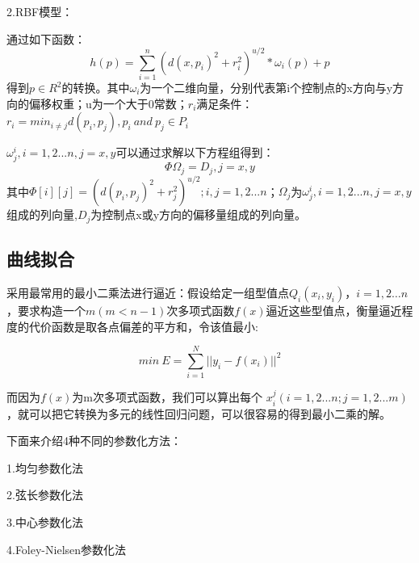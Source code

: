 \documentclass{article}
\begin{document}
    2.RBF模型：
    
    通过如下函数：
    $$h(p) = \sum_{i=1}^n (d(x,p_i)^2+r_i^2)^{u/2}*\omega_i(p)+p$$
    得到$p\in R^2$的转换。其中$\omega_i$为一个二维向量，分别代表第i个控制点的x方向与y方向的偏移权重；u为一个大于0常数；$r_i$满足条件：$r_i = min_{i\neq j}d(p_i,p_j),p_i \ and \  p_j \in P_i$
    
    $\omega^i_j,i=1,2...n,j=x,y$可以通过求解以下方程组得到：
    $$\Phi \Omega_j = D_j,j=x,y$$
    其中$\Phi[i][j] = (d(p_i,p_j)^2+r_j^2)^{u/2};i,j = 1,2...n$；$\Omega_j$为$\omega^i_j,i=1,2...n,j=x,y$组成的列向量,$D_j$为控制点x或y方向的偏移量组成的列向量。
    
    
    
    
    \subsection{曲线拟合}
    
	采用最常用的最小二乘法进行逼近：假设给定一组型值点$Q_i(x_i,y_i)，i=1,2…n$，要求构造一个$m(m<n-1)$次多项式函数$f(x)$逼近这些型值点，衡量逼近程度的代价函数是取各点偏差的平方和，令该值最小:
	
	$$min \ E = \sum_{i=1}^N||y_i-f(x_i)||^2$$
	
	而因为$f(x)$为m次多项式函数，我们可以算出每个 $x_i^j(i=1,2...n;j = 1,2...m)$，就可以把它转换为多元的线性回归问题，可以很容易的得到最小二乘的解。
	
	下面来介绍4种不同的参数化方法：
	
	
	1.均匀参数化法
	
	
	2.弦长参数化法
	
	
	3.中心参数化法
	
	
	4.Foley-Nielsen参数化法
	
\end{document}
